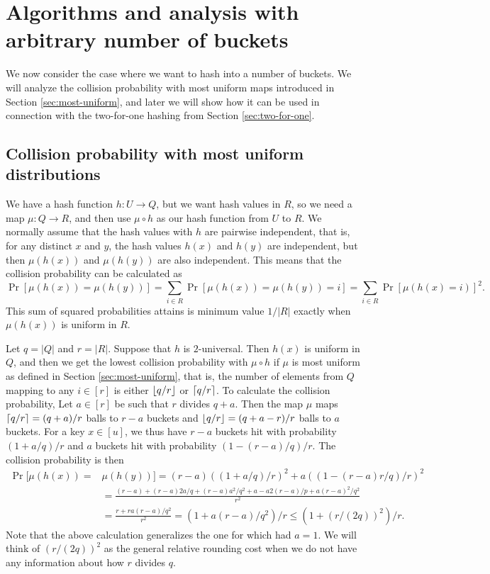 
\section{Algorithms and analysis with arbitrary number of buckets}
We now consider the case where we want to hash into
a number of buckets. We will analyze the collision probability
with most uniform maps introduced in Section \ref{sec:most-uniform},
and later we will show how it can be used in connection with the
two-for-one hashing from Section \ref{sec:two-for-one}.

\subsection{Collision probability with most uniform distributions}
We have a hash function $h:U\to Q$, but we want hash values in $R$, so
we need a map $\mu:Q\to R$, and then use $\mu\circ h$ as
our hash function from $U$ to $R$. We normally assume that the hash values 
with $h$ are pairwise independent, that is, for any distinct $x$ and $y$,
the hash values $h(x)$ and $h(y)$ are independent, but then 
$\mu(h(x))$ and $\mu(h(y))$ are also independent. This means
that the collision probability can be calculated
as 
\[\Pr[\mu(h(x))=\mu(h(y))]=\sum_{i\in R}\Pr[\mu(h(x))=\mu(h(y))=i]=\sum_{i\in R}\Pr[\mu(h(x)=i)]^2.\]
This sum of squared probabilities attains is minimum value $1/|R|$
exactly when $\mu(h(x))$ is uniform in $R$. 

Let $q=|Q|$ and $r=|R|$. Suppose that $h$ is $2$-universal. Then
$h(x)$ is uniform in $Q$, and then we get the lowest collision
probability with $\mu\circ h$ if $\mu$ is most uniform as defined in
Section \ref{sec:most-uniform}, that is, the number of elements from
$Q$ mapping to any $i\in[r]$ is either $\lfloor {q/r} \rfloor$ or
$\lceil {q/r}\rceil$. To calculate the collision probability,
Let $a\in[r]$ be such that $r$ divides $q+a$. Then the map $\mu$ maps
$\lceil {q/r}\rceil=(q+a)/r$ balls to $r-a$ buckets and
$\lfloor {q/r} \rfloor=(q+a-r)/r$ balls to $a$ buckets. For a key $x\in [u]$, we
thus have $r-a$ buckets hit with probability $(1+a/q)/r$ and
$a$ buckets hit with probability $(1-(r-a)/q)/r$.
The collision probability is then
\begin{align}
   \Pr[\mu(h(x))=&\mu(h(y))]= (r-a)((1+a/q)/r)^2+a((1-(r-a)r/q)/r)^2\nonumber\\
                 &=\frac{(r-a)+(r-a)2a/q+(r-a)a^2/q^2+ a-a2(r-a)/p+a(r-a)^2/q^2}{r^2}\nonumber\\
                 &=\frac{r +r a (r-a)/q^2}{r^2}=(1+a(r-a)/q^2)/r\leq \left(1+(r/(2q))^2\right)/r.\label{eq:coll-a}
\end{align}
Note that the above calculation generalizes the one for  which
had $a=1$. We will think of $(r/(2q))^2$ as the general relative rounding
cost when we do not have any information about how $r$ divides $q$.

